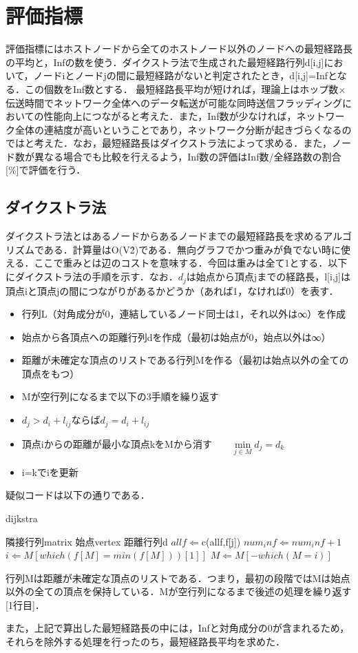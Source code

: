 \section{評価指標}
評価指標にはホストノードから全てのホストノード以外のノードへの最短経路長の平均と，Infの数を使う．ダイクストラ法で生成された最短経路行列d[i,j]において，ノードiとノードjの間に最短経路がないと判定されたとき，d[i,j]=Infとなる．この個数をInf数とする．
最短経路長平均が短ければ，理論上はホップ数$\times$伝送時間でネットワーク全体へのデータ転送が可能な同時送信フラッディングにおいての性能向上につながると考えた．また，Inf数が少なければ，ネットワーク全体の連結度が高いということであり，ネットワーク分断が起きづらくなるのではと考えた．なお，最短経路長はダイクストラ法によって求める．また，ノード数が異なる場合でも比較を行えるよう，Inf数の評価はInf数/全経路数の割合[\%]で評価を行う．

\subsection*{ダイクストラ法}
ダイクストラ法とはあるノードからあるノードまでの最短経路長を求めるアルゴリズムである．計算量はO(V\^2)である．無向グラフでかつ重みが負でない時に使える．ここで重みとは辺のコストを意味する．今回は重みは全て1とする．以下にダイクストラ法の手順を示す．なお．$d_{j}$は始点から頂点jまでの経路長，l[i,j]は頂点iと頂点jの間につながりがあるかどうか（あれば1，なければ0）を表す．

\begin{itemize}
    \item 行列L（対角成分が0，連結しているノード同士は1，それ以外は∞）を作成
    \item 始点から各頂点への距離行列dを作成（最初は始点が0，始点以外は∞）
    \item 距離が未確定な頂点のリストである行列Mを作る（最初は始点以外の全ての頂点をもつ）
    \item Mが空行列になるまで以下の3手順を繰り返す
    \item $d_j> d_i + l_{ij} ならば d_j = d_i + l_{ij}$
    \item 頂点iからの距離が最小な頂点kをMから消す　　$\underset{j\in M}{\min} d_j=d_k$
    \item i=kでiを更新
\end{itemize}

疑似コードは以下の通りである．

\begin{algorithm}                    
\caption{dijkstra}         
\label{alg1}                          
\begin{algorithmic}[1] 
\REQUIRE 隣接行列matrix  始点vertex
\ENSURE 距離行列d
\STATE $allf \Leftarrow $c(allf,f[j])
\ELSE
\STATE $num_inf \Leftarrow num_inf+1$
\ENDIF
\ENDFOR
    \STATE $i \Leftarrow M[which(f[M] = min(f[M]))[1]]$
	\STATE $M \Leftarrow M[-which(M=i)]$
\ENDWHILE
\end{algorithmic}
\end{algorithm}

行列Mは距離が未確定な頂点のリストである．つまり，最初の段階ではMは始点以外の全ての頂点を保持している．Mが空行列になるまで後述の処理を繰り返す[1行目]．

また，上記で算出した最短経路長の中には，Infと対角成分の0が含まれるため，それらを除外する処理を行ったのち，最短経路長平均を求めた．